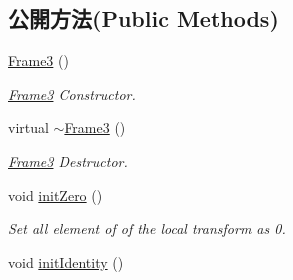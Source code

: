 \subsection*{公開方法(Public Methods)}
\begin{DoxyCompactItemize}
\item 
\hyperlink{class_i_dream_sky_1_1_frame3_ae7f38781fa19c34297fbf6ef5f7cb2c7}{Frame3} ()
\begin{DoxyCompactList}\small\item\em \hyperlink{class_i_dream_sky_1_1_frame3}{Frame3} Constructor. \end{DoxyCompactList}\item 
virtual \hyperlink{class_i_dream_sky_1_1_frame3_a26fdcbf96d3cf66c6a0724399225e10c}{$\sim$\+Frame3} ()
\begin{DoxyCompactList}\small\item\em \hyperlink{class_i_dream_sky_1_1_frame3}{Frame3} Destructor. \end{DoxyCompactList}\item 
void \hyperlink{class_i_dream_sky_1_1_frame3_aa04db3ec07bc5ee51f3a09bfd32b7d5a}{init\+Zero} ()\hypertarget{class_i_dream_sky_1_1_frame3_aa04db3ec07bc5ee51f3a09bfd32b7d5a}{}\label{class_i_dream_sky_1_1_frame3_aa04db3ec07bc5ee51f3a09bfd32b7d5a}

\begin{DoxyCompactList}\small\item\em Set all element of of the local transform as 0. \end{DoxyCompactList}\item 
void \hyperlink{class_i_dream_sky_1_1_frame3_a8a7801ff40fd85a8126ff034a4f369df}{init\+Identity} ()\hypertarget{class_i_dream_sky_1_1_frame3_a8a7801ff40fd85a8126ff034a4f369df}{}\label{class_i_dream_sky_1_1_frame3_a8a7801ff40fd85a8126ff034a4f369df}


\end{DoxyCompactItemize}
